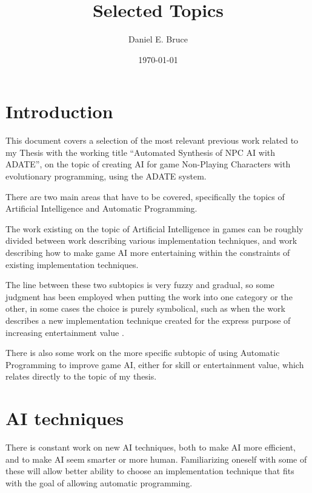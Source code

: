 \documentclass[]{report}
\begin{document}
\title{Selected Topics}
\author{Daniel E. Bruce}
\date{\today}
\maketitle

\tableofcontents

\chapter{Introduction}
\label{cha:introduction}

This document covers a selection of the most relevant previous work related to
my Thesis with the working title ``Automated Synthesis of NPC AI with ADATE'',
on the topic of creating AI for game Non-Playing Characters with evolutionary
programming, using the ADATE system.

There are two main areas that have to be covered, specifically the topics of
Artificial Intelligence and Automatic Programming.

The work existing on the topic of Artificial Intelligence in games can be
roughly divided between work describing various implementation techniques, and
work describing how to make game AI more entertaining within the constraints of
existing implementation techniques.

The line between these two subtopics is very fuzzy and gradual, so some judgment
has been employed when putting the work into one category or the other, in some
cases the choice is purely symbolical, such as when the work describes a new
implementation technique created for the express purpose of increasing
entertainment value \citep[for example][]{khoo2002efficient}.

There is also some work on the more specific subtopic of using Automatic
Programming to improve game AI, either for skill or entertainment value, which
relates directly to the topic of my thesis.

\chapter{AI techniques}
\label{cha:ai-techniques}

There is constant work on new AI techniques, both to make AI more efficient, and
to make AI seem smarter or more human. Familiarizing oneself with some of these
will allow better ability to choose an implementation technique that fits with
the goal of allowing automatic programming.
\end{document}
